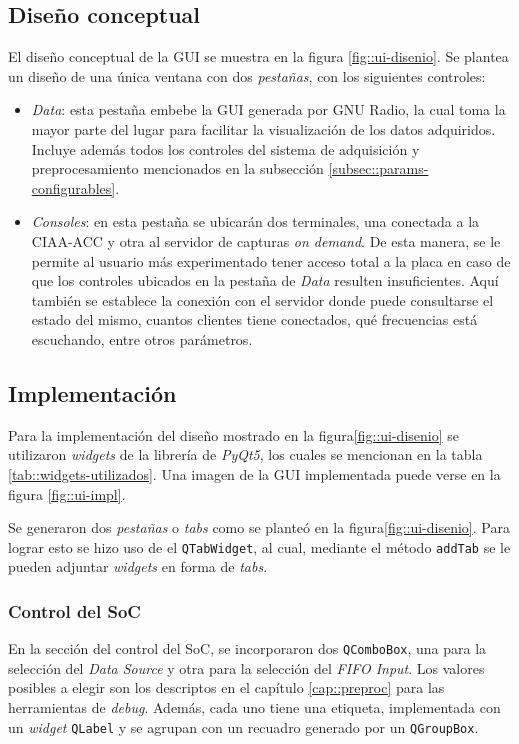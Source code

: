 \documentclass[../../main.tex]{subfiles}
\begin{document}
\subsection{Diseño conceptual}
El diseño conceptual de la GUI se muestra en la figura \ref{fig::ui-disenio}. Se plantea un diseño de una única ventana con dos \textit{pestañas}, con los siguientes controles:
\begin{itemize}
    \item \textit{Data}: esta pestaña embebe la GUI generada por GNU Radio, la cual toma la mayor parte del lugar para facilitar la visualización de los datos adquiridos. Incluye además todos los controles del sistema de adquisición y preprocesamiento mencionados en la subsección \ref{subsec::params-configurables}.
    \item \textit{Consoles}: en esta pestaña se ubicarán dos terminales, una conectada a la CIAA-ACC y otra al servidor de capturas \textit{on demand}. De esta manera, se le permite al usuario más experimentado tener acceso total a la placa en caso de que los controles ubicados en la pestaña de \textit{Data} resulten insuficientes. Aquí también se establece la conexión con el servidor donde puede consultarse el estado del mismo, cuantos clientes tiene conectados, qué frecuencias está escuchando, entre otros parámetros.
\end{itemize}


\subsection{Implementación}
Para la implementación del diseño mostrado en la figura\ref{fig::ui-disenio} se utilizaron \textit{widgets} de la librería de \textit{PyQt5}, los cuales se mencionan en la tabla \ref{tab::widgets-utilizados}. Una imagen de la GUI implementada puede verse en la figura \ref{fig::ui-impl}.

Se generaron dos \textit{pestañas} o \textit{tabs} como se planteó en la figura\ref{fig::ui-disenio}. Para lograr esto se hizo uso de el \texttt{QTabWidget}, al cual, mediante el método \texttt{addTab} se le pueden adjuntar \textit{widgets} en forma de \textit{tabs}. 

\subsubsection{Control del SoC}
En la sección del control del SoC, se incorporaron dos \texttt{QComboBox}, una para la selección del \textit{Data Source} y otra para la selección del \textit{FIFO Input}. Los valores posibles a elegir son los descriptos en el capítulo \ref{cap::preproc} para las herramientas de \textit{debug}. Además, cada uno tiene una etiqueta, implementada con un \textit{widget} \texttt{QLabel} y se agrupan con un recuadro generado por un \texttt{QGroupBox}.
\end{document}
